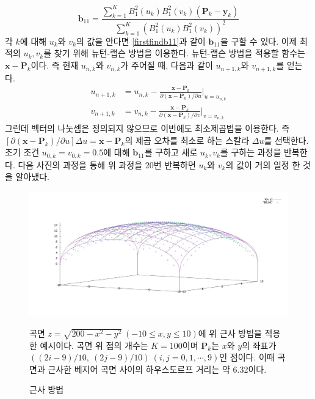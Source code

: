 \documentclass{gshs_thesis}
\theoremstyle{theorem}
\theoremstyle{lemma}
\theoremstyle{definition}
\begin{document}
\begin{equation} \label{firstfindb11}
	\mathbf{b}_{11}=\dfrac{\sum_{k=1}^K B_1^2(u_k)B_1^2(v_k)(\mathbf{P}_k-\mathbf{y}_k)}{\sum_{k=1}^K (B_1^2(u_k)B_1^2(v_k))^2}
\end{equation}
각 $k$에 대해 $u_k$와 $v_k$의 값을 안다면 \eqref{firstfindb11}과 같이 $\mathbf{b}_{11}$을 구할 수 있다. 이제 최적의 $u_k, v_k$를 찾기 위해 뉴턴-랩슨 방법을 이용한다. 뉴턴-랩슨 방법을 적용할 함수는 $\mathbf{x}-\mathbf{P}_k$이다. 즉 현재 $u_{n, k}$와 $v_{n, k}$가 주어질 때, 다음과 같이 $u_{n+1, k}$와 $v_{n+1, k}$를 얻는다. 
\begin{align} \label{rearrangeu}
	u_{n+1, k}&=u_{n, k}-\frac{\mathbf{x}-\mathbf{P}_k}{\partial(\mathbf{x}-\mathbf{P}_k)/\partial u} \bigg|_{u=u_{n, k}} \\
	v_{n+1, k}&=v_{n, k}-\frac{\mathbf{x}-\mathbf{P}_k}{\partial(\mathbf{x}-\mathbf{P}_k)/\partial v} \bigg|_{v=v_{n, k}} \label{rearrangev}
\end{align}
그런데 벡터의 나눗셈은 정의되지 않으므로 이번에도 최소제곱법을 이용한다. 즉 $[\partial(\mathbf{x}-\mathbf{P}_k)/\partial u] \Delta u = \mathbf{x}-\mathbf{P}_k$의 제곱 오차를 최소로 하는 스칼라 $\Delta u$를 선택한다. 
초기 조건 $u_{0, k}=v_{0, k}=0.5$에 대해 $\mathbf{b}_{11}$를 구하고 새로 $u_k, v_k$를 구하는 과정을 반복한다. 
다음 사진의 과정을 통해 위 과정을 20번 반복하면 $u_k$와 $v_k$의 값이 거의 일정 한 것을 알아냈다.


\begin{figure}[h]
	\centering
	\includegraphics[width=\textwidth]{image/leastSquare}
	\caption{근사 방법}
	\label{gnuplot}
	\raggedright\small 곡면 $z=\sqrt{200-x^2-y^2}\ (-10 \leq x, y \leq 10)$에 위 근사 방법을 적용한 예시이다. 곡면 위 점의 개수는 $K=100$이며 $\mathbf{P}_k$는 $x$와 $y$의 좌표가 $((2i-9)/10,\ (2j-9)/10)\ (i, j = 0, 1, \cdots, 9)$인 점이다. 이때 곡면과 근사한 베지어 곡면 사이의 하우스도르프 거리는 약 6.32이다.
\end{figure}
\end{document}
